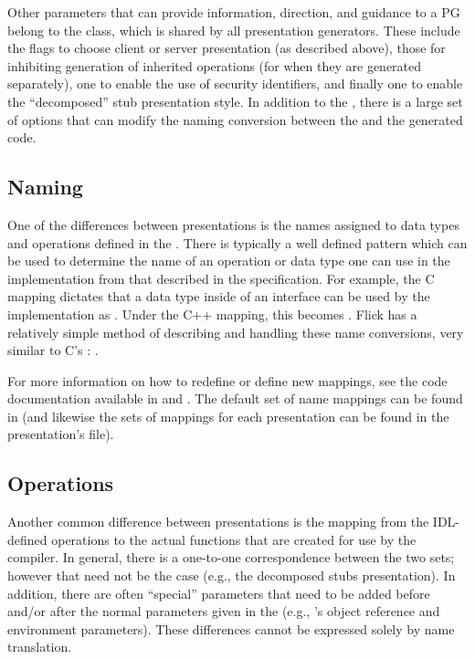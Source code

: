 Other parameters that can provide information, direction, and guidance to a PG
belong to the  class, which is shared by all presentation
generators.  These include the flags to choose client or server presentation
(as described above), those for inhibiting generation of inherited operations
(for when they are generated separately), one to enable the use of security
identifiers, and finally one to enable the ``decomposed'' stub presentation
style.  In addition to the , there is a large set of options
that can modify the naming conversion between the \IDL{} and the generated
code.


\subsection{Naming}
\label{subsec:PG:Naming}

One of the differences between presentations is the names assigned to data
types and operations defined in the \IDL{}\@.  There is typically a well
defined pattern which can be used to determine the name of an operation or data
type one can use in the implementation from that described in the \IDL{}
specification.  For example, the \CORBA{} C mapping dictates that a data type
 inside of an interface  can be used by the
implementation as .  Under the \CORBA{} C++ mapping, this
becomes .  Flick has a relatively simple method of describing
and handling these name conversions, very similar to C's
: .

For more information on how to redefine or define new 
mappings, see the code documentation available in  and
.  The default set of name mappings can be
found in  (and likewise the sets of mappings
for each presentation can be found in the presentation's  file).


\subsection{Operations}
\label{subsec:PG:Operations}

Another common difference between presentations is the mapping from the
IDL-defined operations to the actual functions that are created for use by the
\IDL{} compiler.  In general, there is a one-to-one correspondence between the
two sets; however that need not be the case (e.g., the decomposed stubs
presentation).  In addition, there are often ``special'' parameters that need
to be added before and/or after the normal parameters given in the \IDL{}
(e.g., \CORBA{}'s object reference and environment parameters).  These
differences cannot be expressed solely by name translation.

